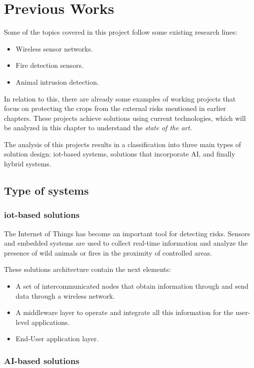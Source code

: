 \section{Previous Works}

Some of the topics covered in this project follow some existing research lines:
\begin{itemize}
    \item Wireless sensor networks.
    \item Fire detection sensors.
    \item Animal intrusion detection.
\end{itemize}

In relation to this, there are already some examples of working projects that focus on 
protecting the crops from the external risks mentioned in earlier chapters. These projects achieve solutions 
using current technologies, which will be analyzed in this chapter to understand the \textit{state of the art}. 

The analysis of this projects results in a classification into three main types of solution design: \acrshort{iot}-based systems, 
solutions that incorporate AI, and finally hybrid systems.

\subsection{Type of systems}
\subsubsection*{\acrshort{iot}-based solutions}

The Internet of Things has become an important tool for detecting risks. Sensors and embedded systems are used 
to collect real-time information and analyze the presence of wild animals or fires in the proximity of controlled areas.

These solutions architecture contain the next elements:
\begin{itemize}
    \item A set of intercommunicated nodes that obtain information through and send data through a wireless network.
    \item A middleware layer to operate and integrate all this information for the user-level applications.
    \item End-User application layer.
\end{itemize}

\subsubsection*{AI-based solutions}

